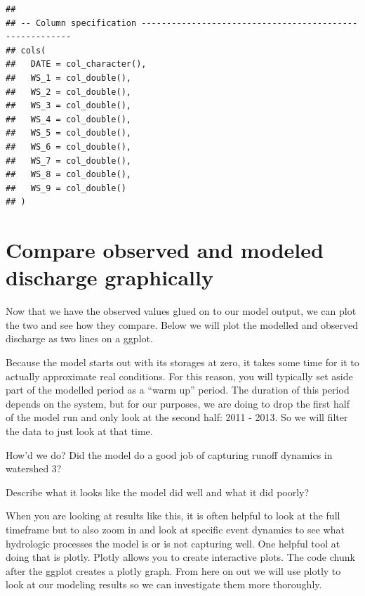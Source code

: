 \documentclass[
]{book}
\newenvironment{Shaded}{\begin{snugshade}}{\end{snugshade}}
\newcommand{\FunctionTok}[1]{\textcolor[rgb]{0.00,0.00,0.00}{#1}}
\newcommand{\NormalTok}[1]{#1}
\newcommand{\OtherTok}[1]{\textcolor[rgb]{0.56,0.35,0.01}{#1}}
\newcommand{\SpecialCharTok}[1]{\textcolor[rgb]{0.00,0.00,0.00}{#1}}
\begin{document}
\begin{verbatim}
## 
## -- Column specification --------------------------------------------------------
## cols(
##   DATE = col_character(),
##   WS_1 = col_double(),
##   WS_2 = col_double(),
##   WS_3 = col_double(),
##   WS_4 = col_double(),
##   WS_5 = col_double(),
##   WS_6 = col_double(),
##   WS_7 = col_double(),
##   WS_8 = col_double(),
##   WS_9 = col_double()
## )
\end{verbatim}

\begin{Shaded}
\end{Shaded}

\hypertarget{compare-observed-and-modeled-discharge-graphically}{%
\section{Compare observed and modeled discharge graphically}\label{compare-observed-and-modeled-discharge-graphically}}

Now that we have the observed values glued on to our model output, we can plot the two and see how they compare. Below we will plot the modelled and observed discharge as two lines on a ggplot.

Because the model starts out with its storages at zero, it takes some time for it to actually approximate real conditions. For this reason, you will typically set aside part of the modelled period as a ``warm up'' period. The duration of this period depends on the system, but for our purposes, we are doing to drop the first half of the model run and only look at the second half: 2011 - 2013. So we will filter the data to just look at that time.

How'd we do? Did the model do a good job of capturing runoff dynamics in watershed 3?

Describe what it looks like the model did well and what it did poorly?

When you are looking at results like this, it is often helpful to look at the full timeframe but to also zoom in and look at specific event dynamics to see what hydrologic processes the model is or is not capturing well. One helpful tool at doing that is plotly. Plotly allows you to create interactive plots. The code chunk after the ggplot creates a plotly graph. From here on out we will use plotly to look at our modeling results so we can investigate them more thoroughly.
\end{document}
